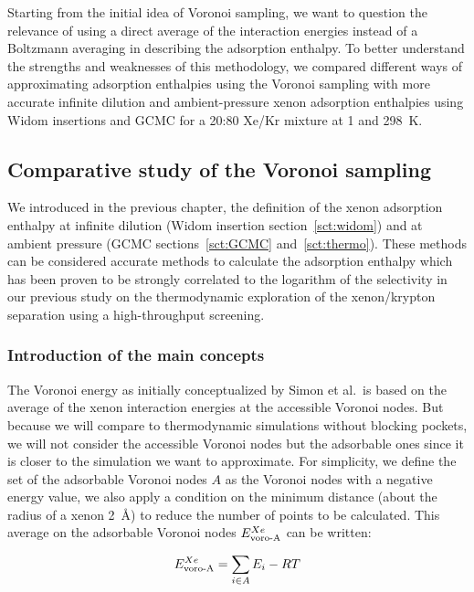\documentclass[main]{subfiles}
\begin{document}
Starting from the initial idea of Voronoi sampling, we want to question the relevance of using a direct average of the interaction energies instead of a Boltzmann averaging in describing the adsorption enthalpy. To better understand the strengths and weaknesses of this methodology, we compared different ways of approximating adsorption enthalpies using the Voronoi sampling with more accurate infinite dilution and ambient-pressure xenon adsorption enthalpies using Widom insertions and GCMC for a 20:80 Xe/Kr mixture at \SI{1}{\atm} and \SI{298}{\kelvin}.

\subsection{Comparative study of the Voronoi sampling}

We introduced in the previous chapter, the definition of the xenon adsorption enthalpy at infinite dilution (Widom insertion section~\ref{sct:widom}) and at ambient pressure (GCMC sections~\ref{sct:GCMC} and~\ref{sct:thermo}). These methods can be considered accurate methods to calculate the adsorption enthalpy which has been proven to be strongly correlated to the logarithm of the selectivity in our previous study on the thermodynamic exploration of the xenon/krypton separation using a high-throughput screening.

\subsubsection{Introduction of the main concepts}

The Voronoi energy as initially conceptualized by Simon et al.\ is based on the average of the xenon interaction energies at the accessible Voronoi nodes. But because we will compare to thermodynamic simulations without blocking pockets, we will not consider the accessible Voronoi nodes but the adsorbable ones since it is closer to the simulation we want to approximate. For simplicity, we define the set of the adsorbable Voronoi nodes $A$ as the Voronoi nodes with a negative energy value, we also apply a condition on the minimum distance (about the radius of a xenon \SI{2}{\angstrom}) to reduce the number of points to be calculated. This average on the adsorbable Voronoi nodes $E_{\text{voro-A}}^{Xe}$ can be written:

\begin{equation}
    E_{\text{voro-A}}^{Xe} = \sum_{i \in A} E_i -RT
\end{equation}
\end{document}
